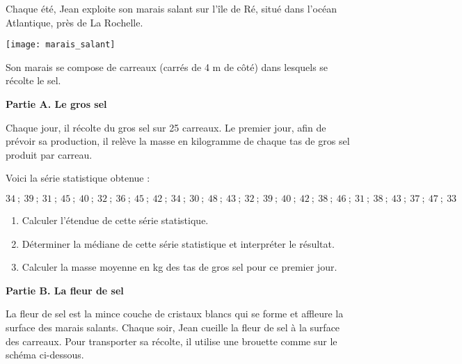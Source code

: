 
\medskip 

\parbox{0.45\linewidth}{Chaque été, Jean exploite son marais salant sur l'île de Ré, situé dans l'océan Atlantique, près de La Rochelle.}\hfill
\parbox{0.45\linewidth}{\texttt{[image: marais\_salant]}}

\medskip

Son marais se compose de carreaux (carrés de 4 m de côté) dans lesquels se récolte le sel.

\bigskip

\textbf{Partie A. Le gros sel}

\medskip

Chaque jour, il récolte du gros sel sur 25 carreaux. Le premier jour, afin de prévoir sa production, il relève la masse en kilogramme de chaque tas de gros sel produit par carreau.

Voici la série statistique obtenue :

\[34~;~39 ~;~  31 ~;~  45 ~;~  40 ~;~  32 ~;~  36 ~;~  45 ~;~  42 ~;~  34 ~;~  30 ~;~  48 ~;~  43~;~
32 ~;~  39 ~;~  40 ~;~ 42 ~;~  38 ~;~  46 ~;~  31 ~;~  38 ~;~  43 ~;~  37 ~;~  47 ~;~  33\]

\medskip

\begin{enumerate}
\item Calculer l'étendue de cette série statistique.
\item Déterminer la médiane de cette série statistique et interpréter le résultat.
\item Calculer la masse moyenne en kg des tas de gros sel pour ce premier jour.
\end{enumerate}

\bigskip

\textbf{Partie B. La fleur de sel}

\medskip

La fleur de sel est la mince couche de cristaux blancs qui se forme et affleure la surface des
marais salants. Chaque soir, Jean cueille la fleur de sel à la surface des carreaux. Pour
transporter sa récolte, il utilise une brouette comme sur le schéma ci-dessous.

